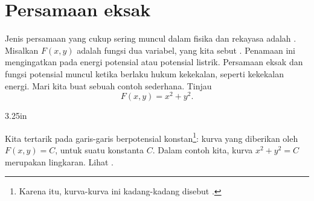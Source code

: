 
\sectionnewpage
\section{Persamaan eksak}
\label{exact:section}



Jenis persamaan yang cukup sering muncul dalam fisika dan
rekayasa adalah
\emph{}.
Misalkan $F(x,y)$ adalah fungsi dua variabel, yang kita sebut
\emph{}.  Penamaan ini mengingatkan pada
energi potensial atau potensial listrik.  Persamaan eksak dan fungsi
potensial muncul ketika berlaku hukum kekekalan, seperti
kekekalan energi.
Mari kita buat sebuah contoh sederhana.  Tinjau
\begin{equation*}
F(x,y) = x^2+y^2 .
\end{equation*}

\begin{mywrapfig}[16]{3.25in}
\capstart
{}
\caption{Solusi $F(x,y) = x^2+y^2 = C$ untuk berbagai
nilai $C$.\label{exact:circlesfig}}
\end{mywrapfig}
Kita tertarik pada garis-garis berpotensial konstan\footnote{Karena itu,
kurva-kurva ini kadang-kadang disebut \emph{}.}:
kurva yang diberikan oleh $F(x,y) = C$,
untuk suatu konstanta $C$.  Dalam
contoh kita, kurva $x^2+y^2=C$ merupakan lingkaran.  Lihat
.

